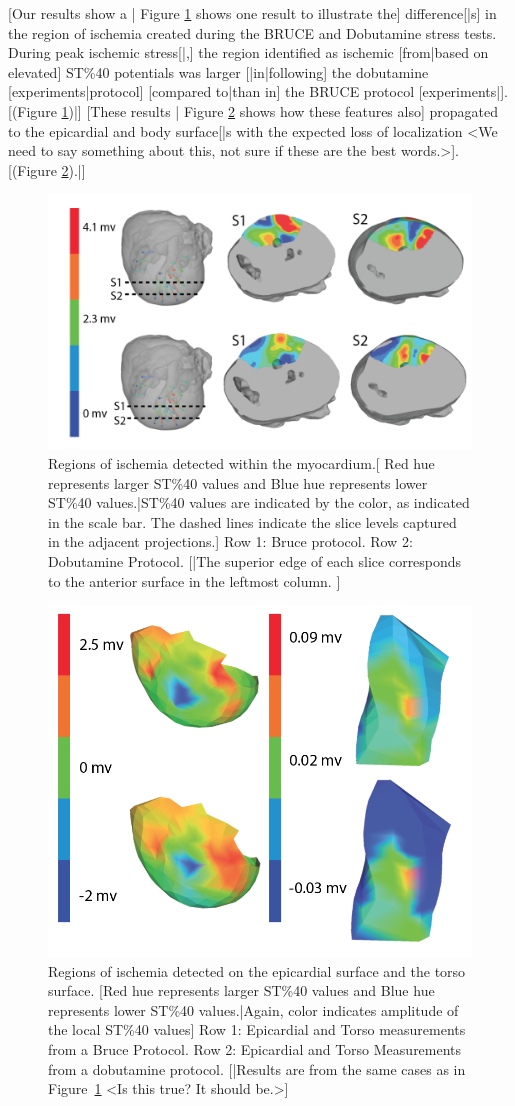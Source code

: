 \documentclass[twocolumn]{cinc}
\begin{document}
[Our results show a | Figure \ref{fig:myo} shows one result to illustrate
the] difference[|s] in the region of ischemia created during the BRUCE and
Dobutamine stress tests. During peak ischemic stress[|,] the region
identified as ischemic [from|based on elevated] ST\%40 potentials was
larger [|in|following] the dobutamine [experiments|protocol] [compared
to|than in] the BRUCE protocol [experiments|]. [(Figure \ref{fig:myo})|]
[These results | Figure \ref{fig:epitorso} shows how these features also]
propagated to the epicardial and body surface[|s with the expected loss of
localization <We need to say something about this, not sure if these are
the best words.>]. [(Figure \ref{fig:epitorso}).|]


\begin{figure}
	\centering
	\includegraphics[width = .45\textwidth]{../Figures/1.png}
	
	\caption{Regions of ischemia detected within the myocardium.[ Red
          hue represents larger ST\%40 values and Blue hue represents lower
          ST\%40 values.|ST\%40 values are indicated by the color, as
          indicated in the scale bar.  The dashed lines indicate the slice
          levels captured in the adjacent projections.] Row 1: Bruce
          protocol. Row 2: Dobutamine Protocol. [|The superior edge of each
          slice corresponds to the anterior surface in the leftmost
          column. ]}
	\label{fig:myo}
\end{figure}

\begin{figure}
	\centering
	\includegraphics[width = .45\textwidth]{../Figures/2.png}

	\caption{Regions of ischemia detected on the epicardial surface and
          the torso surface. [Red hue represents larger ST\%40 values and
          Blue hue represents lower ST\%40 values.|Again, color indicates
          amplitude of the local ST\%40 values] Row 1: Epicardial and
          Torso measurements from a Bruce Protocol. Row 2: Epicardial and
          Torso Measurements from a dobutamine protocol.  [|Results are
          from the same cases as in Figure~\ref{fig:myo} <Is this true?  It
          should be.>] }
	\label{fig:epitorso}
\end{figure}
\end{document}

